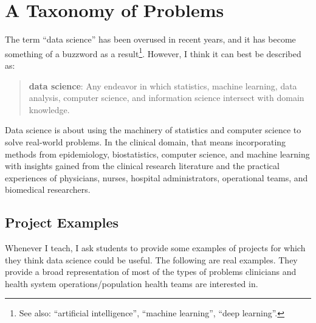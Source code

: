 \chapter{A Taxonomy of Problems \label{chapter:overview}}

The term ``data science'' has been overused in recent years, and it has become something of a buzzword as a result\footnote{See also: ``artificial intelligence'', ``machine learning'', ``deep learning''.}. However, I think it can best be described as: 
\begin{quote}
\textbf{data science}: Any endeavor in which statistics, machine learning, data analysis, computer science, and information science intersect with domain knowledge.
\end{quote}
Data science is about using the machinery of statistics and computer science to solve real-world problems. In the clinical domain, that means incorporating methods from epidemiology, biostatistics, computer science, and machine learning with insights gained from the clinical research literature and the practical experiences of physicians, nurses, hospital administrators, operational teams, and biomedical researchers.


\section{Project Examples \label{section:projectexamples}}

Whenever I teach, I ask students to provide some examples of projects for which they think data science could be useful. The following are real examples. They provide a broad representation of most of the types of problems clinicians and health system operations/population health teams are interested in. 

